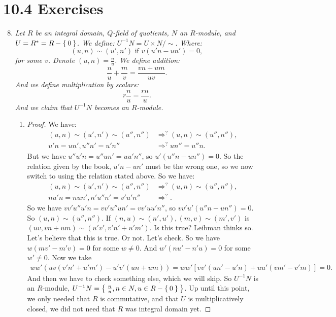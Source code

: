 \documentclass[12pt]{amsbook}
\theoremstyle{plain}
\numberwithin{section}{chapter}
\numberwithin{equation}{chapter}
\theoremstyle{definition}
\theoremstyle{remark}
\newcommand{\bee}{\begin{equation}\begin{aligned}}
\newcommand{\eee}{\end{aligned}\end{equation}}
\newcommand{\fracc}{\frac}
\begin{document}
\section*{10.4 Exercises}
\begin{enumerate}[label=\arabic*.]


\setcounter{enumi}{7}

\item \textit{Let $R$ be an integral domain, $Q$-field of quotients, $N$ an $R$-module, and $U = R^* = R - \Set{0}$. We define: $U^{-1}N = U \times N/\sim$. Where: 
$$
(u,n) \sim (u',n') \text{ if } v(u'n - un') = 0,
$$
for some $v$. Denote $(u,n) = \fracc{n}{u}$. We define addition: 
$$
\fracc{n}{u}+\fracc{m}{v} = \fracc{vn + um}{uv}.
$$
And we define multiplication by scalars: 
$$
r\fracc{n}{u} = \fracc{rn}{u}.
$$
And we claim that $U^{-1}N$ becomes an $R$-module. 
}

\begin{enumerate}
\item 

\begin{proof}
We have: 
\bee
(u,n) \sim (u',n') \sim (u'',n'') &\Rightarrow^{?} (u,n) \sim (u'',n''),\\
u'n = un',u''n' = u'n'' &\Rightarrow^{?} un'' = u''n.
\eee
But we have $u''u'n = u''un' = uu'n''$, so $u'(u''n - un'') = 0$. So the relation given by the book, $u'n - un'$ must be the wrong one, so we now switch to using the relation stated above. So we have: 
\bee
(u,n) \sim (u',n') \sim (u'',n'')& \Rightarrow^{?} (u,n) \sim (u'',n''),\\
nu'n = nun',n'u''n' = v'u'n'' &\Rightarrow^{?}.
\eee
So we have $vv'u''u'n = vv'u''un' = vv'uu'n''$, so $vv'u'(u''n - un'') = 0$. So $(u,n) \sim (u'',n'')$. If $(n,u) \sim (n',u'),(m,v) \sim (m',v')$ is $(uv,vn + um) \sim (u'v',v'n' + u'm')$. Is this true? Leibman thinks so. Let's believe that this is true. Or not. Let's check. So we have $w(mv' - m'v) = 0$ for some $w \neq 0$. And $w'(nu' - n'u) = 0$ for some $w' \neq 0$. Now we take \bee
ww'(uv(v'n' + u'm') - u'v'(un + um)) = ww'[vv'(un' - u'n) + uu'(vm' - v'm)] = 0.
\eee
And then we have to check something else, which we will skip. So $U^{-1}N$ is an $R$-module, $U^{-1}N = \Set{\fracc{n}{u},n \in N,u \in R - \Set{0}}$. Up until this point, we only needed that $R$ is commutative, and that $U$ is multiplicatively closed, we did not need that $R$ was integral domain yet. 

\end{proof}


\end{enumerate}
\end{enumerate}
\end{document}
